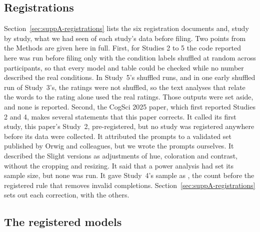 \subsection*{Registrations}

Section~\ref{sec:suppA-registrations} lists the six registration documents and, study by study, what we had seen of each study's data before filing. Two points from the Methods are given here in full. First, for Studies 2 to 5 the code reported here was run before filing only with the condition labels shuffled at random across participants, so that every model and table could be checked while no number described the real conditions. In Study~5's shuffled runs, and in one early shuffled run of Study~3's, the ratings were not shuffled, so the text analyses that relate the words to the rating alone used the real ratings. Those outputs were set aside, and none is reported. Second, the CogSci 2025 paper,\cite{kamper2025originalsin} which first reported Studies 2 and 4, makes several statements that this paper corrects. It called its first study, this paper's Study~2, pre-registered, but no study was registered anywhere before its data were collected. It attributed the prompts to a validated set published by Orwig and colleagues,\cite{orwig2026using} but we wrote the prompts ourselves. It described the Slight versions as adjustments of hue, coloration and contrast, without the cropping and resizing. It said that a power analysis had set its sample size, but none was run. It gave Study~4's sample as \SFourNBeforeValidity, the count before the registered rule that removes \SFourNInvalidRemoved{} invalid completions. Section~\ref{sec:suppA-registrations} sets out each correction, with the others.

\subsection*{The registered models}

